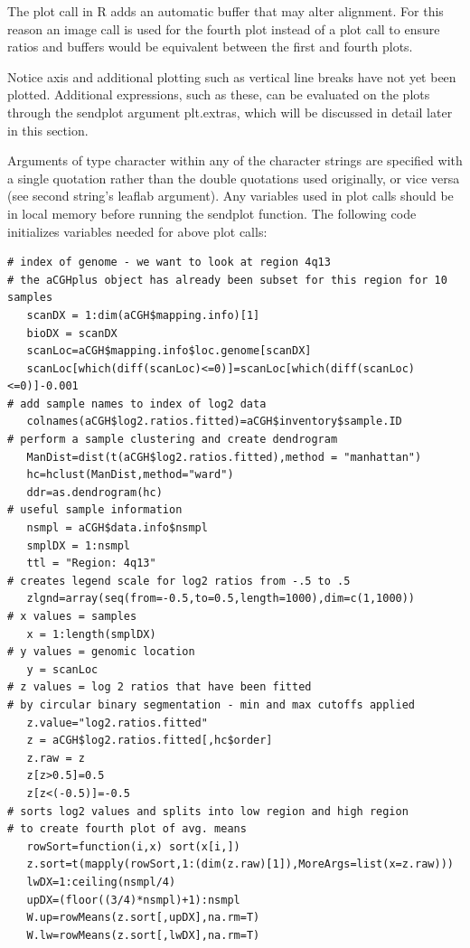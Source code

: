 \documentclass[]{article}
\begin{document}
  The plot call in R adds an automatic buffer that may alter alignment. For this reason  an image call is used for the fourth plot instead of a plot call to ensure ratios and buffers would be equivalent between the first and fourth plots. 

 Notice axis and additional plotting such as vertical line breaks have not yet been plotted. Additional expressions, such as these, can be evaluated on the plots through the sendplot argument plt.extras, which will be discussed in detail later in this section. \newline

\indent Arguments of type character within any of the character strings are specified with a single quotation rather than the double quotations used originally, or vice versa (see second string's leaflab argument). Any variables used in plot calls should be in local memory before running the sendplot function. The following code initializes variables needed for above plot calls:
\begin{verbatim}
# index of genome - we want to look at region 4q13 
# the aCGHplus object has already been subset for this region for 10 samples
   scanDX = 1:dim(aCGH$mapping.info)[1]
   bioDX = scanDX
   scanLoc=aCGH$mapping.info$loc.genome[scanDX]
   scanLoc[which(diff(scanLoc)<=0)]=scanLoc[which(diff(scanLoc)<=0)]-0.001
# add sample names to index of log2 data
   colnames(aCGH$log2.ratios.fitted)=aCGH$inventory$sample.ID
# perform a sample clustering and create dendrogram 
   ManDist=dist(t(aCGH$log2.ratios.fitted),method = "manhattan")
   hc=hclust(ManDist,method="ward")
   ddr=as.dendrogram(hc)
# useful sample information
   nsmpl = aCGH$data.info$nsmpl
   smplDX = 1:nsmpl
   ttl = "Region: 4q13"
# creates legend scale for log2 ratios from -.5 to .5
   zlgnd=array(seq(from=-0.5,to=0.5,length=1000),dim=c(1,1000))
# x values = samples 
   x = 1:length(smplDX)
# y values = genomic location
   y = scanLoc
# z values = log 2 ratios that have been fitted 
# by circular binary segmentation - min and max cutoffs applied
   z.value="log2.ratios.fitted"
   z = aCGH$log2.ratios.fitted[,hc$order]
   z.raw = z
   z[z>0.5]=0.5
   z[z<(-0.5)]=-0.5
# sorts log2 values and splits into low region and high region
# to create fourth plot of avg. means 
   rowSort=function(i,x) sort(x[i,])
   z.sort=t(mapply(rowSort,1:(dim(z.raw)[1]),MoreArgs=list(x=z.raw)))
   lwDX=1:ceiling(nsmpl/4)
   upDX=(floor((3/4)*nsmpl)+1):nsmpl
   W.up=rowMeans(z.sort[,upDX],na.rm=T)
   W.lw=rowMeans(z.sort[,lwDX],na.rm=T)
\end{verbatim}
\end{document}
